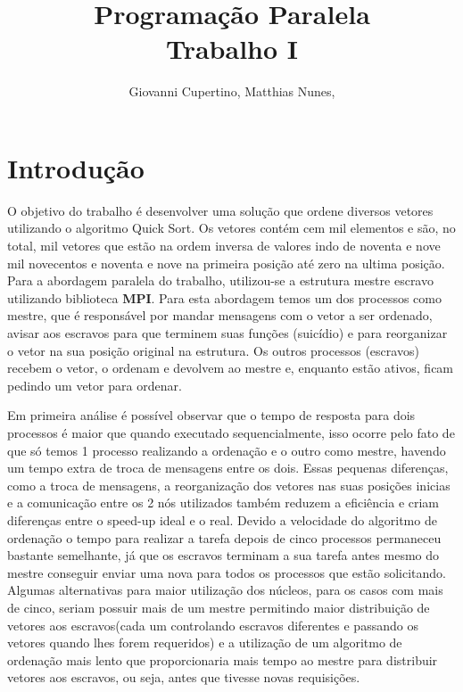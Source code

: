 \documentclass[9pt]{IEEEtran}
\title{Programação Paralela\\ Trabalho I}
\author{Giovanni Cupertino, Matthias Nunes, \IEEEmembership{Usuário pp12820}}
\begin{document}
\maketitle

\section{Introdução}

O objetivo do trabalho é desenvolver uma solução que ordene diversos vetores
utilizando o algoritmo Quick Sort.  Os vetores contém cem mil elementos e são,
no total, mil vetores que estão na ordem inversa de valores indo de noventa e
nove mil novecentos e noventa e nove na primeira posição até zero na ultima
posição.  Para a abordagem paralela do trabalho, utilizou-se a estrutura mestre
escravo utilizando biblioteca \textbf{MPI}. Para esta abordagem temos um dos
processos como mestre, que é responsável por mandar mensagens com o vetor a ser
ordenado, avisar aos escravos para que terminem suas funções (suicídio) e para
reorganizar o vetor na sua posição original na estrutura. Os outros processos
(escravos) recebem o vetor, o ordenam e devolvem ao mestre e, enquanto estão
ativos, ficam pedindo um vetor para ordenar.


Em primeira análise é possível observar que o tempo de resposta para dois
processos é maior que quando executado sequencialmente, isso ocorre pelo fato de
que só temos 1 processo realizando a ordenação e o outro como mestre, havendo um
tempo extra de troca de mensagens entre os dois. Essas pequenas diferenças, como
a troca de mensagens, a reorganização dos vetores nas suas posições inicias e a
comunicação entre os 2 nós utilizados também reduzem a eficiência e criam
diferenças entre o speed-up ideal e o real. Devido a velocidade do algoritmo de
ordenação o tempo para realizar a tarefa depois de cinco processos permaneceu
bastante semelhante, já que os escravos terminam a sua tarefa antes mesmo do
mestre conseguir enviar uma nova para todos os processos que estão solicitando.
Algumas alternativas para maior utilização dos núcleos, para os casos com mais
de cinco, seriam possuir mais de um mestre permitindo maior distribuição de
vetores aos escravos(cada um controlando escravos diferentes e passando os
vetores quando lhes forem requeridos) e a utilização de um algoritmo de
ordenação mais lento que proporcionaria mais tempo ao mestre para distribuir
vetores aos escravos, ou seja, antes que tivesse novas requisições.
\end{document}
